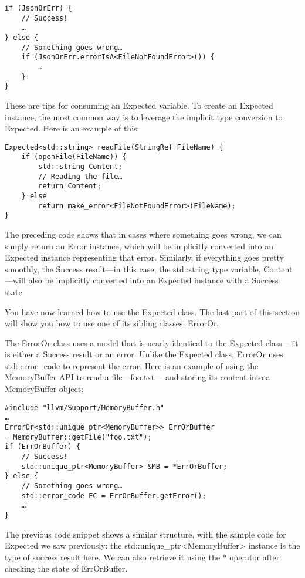 \begin{lstlisting}[style=styleCXX]
if (JsonOrErr) {
	// Success!
	…
} else {
	// Something goes wrong…
	if (JsonOrErr.errorIsA<FileNotFoundError>()) {
		…
	}
}
\end{lstlisting}

These are tips for consuming an Expected variable. To create an Expected instance, the most common way is to leverage the implicit type conversion to Expected. Here is an example of this:

\begin{lstlisting}[style=styleCXX]
Expected<std::string> readFile(StringRef FileName) {
	if (openFile(FileName)) {
		std::string Content;
		// Reading the file…
		return Content;
	} else
		return make_error<FileNotFoundError>(FileName);
}
\end{lstlisting}

The preceding code shows that in cases where something goes wrong, we can simply return an Error instance, which will be implicitly converted into an Expected instance representing that error. Similarly, if everything goes pretty smoothly, the Success result—in this case, the std::string type variable, Content—will also be implicitly converted into an Expected instance with a Success state.

You have now learned how to use the Expected class. The last part of this section will show you how to use one of its sibling classes: ErrorOr.


The ErrorOr class uses a model that is nearly identical to the Expected class— it is either a Success result or an error. Unlike the Expected class, ErrorOr uses std::error\_code to represent the error. Here is an example of using the MemoryBuffer API to read a file—foo.txt— and storing its content into a MemoryBuffer object:

\begin{lstlisting}[style=styleCXX]
#include "llvm/Support/MemoryBuffer.h"
…
ErrorOr<std::unique_ptr<MemoryBuffer>> ErrOrBuffer
= MemoryBuffer::getFile("foo.txt");
if (ErrOrBuffer) {
	// Success!
	std::unique_ptr<MemoryBuffer> &MB = *ErrOrBuffer;
} else {
	// Something goes wrong…
	std::error_code EC = ErrOrBuffer.getError();
	…
}
\end{lstlisting}

The previous code snippet shows a similar structure, with the sample code for Expected we saw previously: the std::unique\_ptr<MemoryBuffer> instance is the type of success result here. We can also retrieve it using the * operator after checking the state of ErrOrBuffer.

